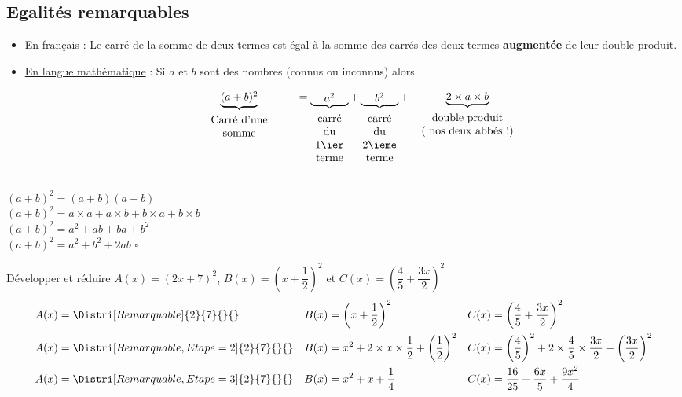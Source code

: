 \subsection{Egalités remarquables}
\begin{propriete}
    \begin{itemize}
    \item \underline{En français} : 
    \og{}Le carré de la somme de deux termes est égal à la somme des carrés des deux termes {\bfseries augmentée} de leur double produit.\fg{}

    \bigskip
    \item \underline{En \og{}langue\fg{} mathématique} :
    Si $a$ et $b$ sont des nombres (connus ou inconnus) alors 
    
    $$\underbrace{\parbox{0.1\linewidth}{\centering $(a+b)^2$}}_{\parbox{0.3\linewidth}{\centering\vspace*{1mm}Carré d'une\\somme}}
    =\underbrace{\parbox{0.1\linewidth}{\centering $a^2$}}_{\parbox{0.1\linewidth}{\centering\vspace*{1mm}carré du\\1\ier terme}}
    +\underbrace{\parbox{0.1\linewidth}{\centering $b^2$}}_{\parbox{0.1\linewidth}{\centering\vspace*{1mm}carré du\\2\ieme terme}}
    +\underbrace{\centering 2\times a\times b}_{\parbox{0.3\linewidth}{\centering\vspace*{1mm}double produit\\( nos deux abbés !)}}$$    
    \end{itemize}
\end{propriete}

\begin{preuve}
    \phantom{rrr}\\
    $(a+b)^2=(a+b)(a+b)$\\
    $(a+b)^2=a\times a+a\times b+b\times a+b\times b$\\
    $(a+b)^2=a^2+ab+ba+b^2$\\
    $(a+b)^2=a^2+b^2+2ab$ $\square$
\end{preuve}

\begin{exemples*1}
    Développer et réduire $A(x)=(2x+7)^2$, $B(x)=\left(x+\dfrac{1}{2}\right)^2$ et $C(x)=\left(\dfrac{4}{5}+\dfrac{3x}{2}\right)^2$
    \correction
    \begin{align*}
        A(x)&=\Distri[Remarquable]{2}{7}{}{}        &B(x)&=\left(x+\dfrac{1}{2}\right)^2&C(x)&=\left(\dfrac{4}{5}+\dfrac{3x}{2}\right)^2\\
        A(x)&=\Distri[Remarquable,Etape=2]{2}{7}{}{}&B(x)&=x^2+2\times x\times \dfrac{1}{2} + \left(\dfrac{1}{2}\right)^2&C(x)&=\left(\dfrac{4}{5}\right)^2+2\times\dfrac{4}{5}\times\dfrac{3x}{2} + \left(\dfrac{3x}{2}\right)^2\\
        A(x)&=\Distri[Remarquable,Etape=3]{2}{7}{}{}&B(x)&=x^2+ x + \dfrac{1}{4}&C(x)&=\dfrac{16}{25}+\dfrac{6x}{5}+ \dfrac{9x^2}{4}
    \end{align*}
\end{exemples*1}

